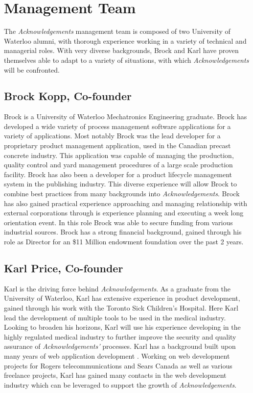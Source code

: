 \section{Management Team}

The {\it Acknowledgements}  management team is composed of two University of Waterloo alumni, with thorough experience working in a variety of technical and managerial roles. With very diverse backgrounds, Brock and Karl have proven themselves able to adapt to a variety of situations, with which {\it Acknowledgements} will be confronted.

\subsection{Brock Kopp, Co-founder}
Brock is a University of Waterloo Mechatronics Engineering graduate. Brock has developed a wide variety of process management software applications for a variety of applications. Most notably Brock was the lead developer for a proprietary product management application, used in the Canadian precast concrete industry. This application was capable of managing the production, quality control and yard management procedures of a large scale production facility. Brock has also been a developer for a product lifecycle management system in the publishing industry. This diverse experience will allow Brock to combine best practices from many backgrounds into {\it Acknowledgements}. Brock has also gained practical experience approaching and managing relationship with external corporations through is experience planning and executing a week long orientation event. In this role Brock was able to secure funding from various industrial sources. Brock has a strong financial background, gained through his role as Director for an \$11 Million endowment foundation over the past 2 years.

\subsection{Karl Price, Co-founder}
Karl is the driving force behind {\it Acknowledgements}. As a graduate from the University of Waterloo, Karl has extensive experience in product development, gained through his work with the Toronto Sick Children's Hospital. Here Karl lead the development of multiple tools to be used in the medical industry. Looking to broaden his horizons, Karl will use his experience developing in the highly regulated medical industry to further improve the security and quality assurance of {\it Acknowledgements'} processes. Karl has a background built upon many years of web application development . Working on web development projects for Rogers telecommunications and Sears Canada as well as various freelance projects, Karl has gained many contacts in the web development industry which can be leveraged to support the growth of {\it Acknowledgements}.

